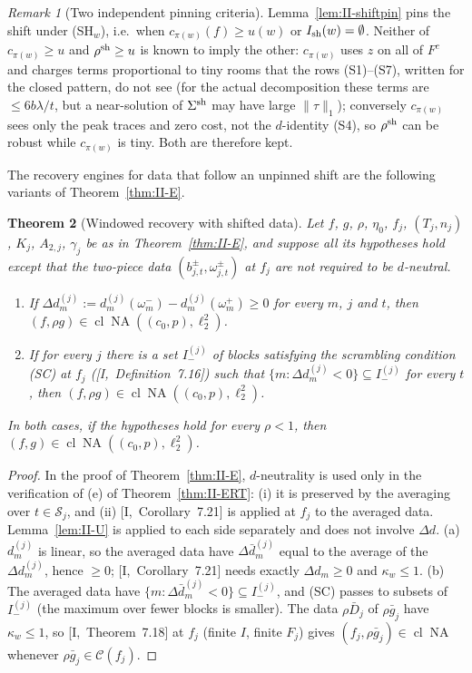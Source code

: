 \documentclass[10pt]{amsart}
\newtheorem{theorem}{Theorem}[section]
\theoremstyle{definition}
\theoremstyle{remark}
\newtheorem{remark}[theorem]{Remark}
\newcommand{\NA}{\operatorname{NA}}
\newcommand{\Cset}{\mathcal C}
\newcommand{\cl}{\operatorname{cl}}
\begin{document}
\begin{remark}[Two independent pinning criteria]\label{rem:II-twocrit}
Lemma~\ref{lem:II-shiftpin} pins the shift under (SH$_w$), i.e.\ when $c_{\pi(w)}(f)\ge
u(w)$ or $I_{\rm sh}(w)=\emptyset$.  Neither of $c_{\pi(w)}\ge u$ and
$\rho^{\rm sh}\ge u$ is known to imply the other: $c_{\pi(w)}$ uses $z$ on all
of $F^c$ and charges terms proportional to tiny rooms that the rows
(S1)--(S7), written for the closed pattern, do not see (for the actual
decomposition these terms are $\le6b\lambda/t$, but a near-solution of
$\Sigma^{\rm sh}$ may have large $\|\tau\|_1$); conversely $c_{\pi(w)}$ sees
only the peak traces and zero cost, not the $d$-identity (S4), so $\rho^{\rm
sh}$ can be robust while $c_{\pi(w)}$ is tiny.  Both are therefore kept.
\end{remark}

The recovery engines for data that follow an unpinned shift are the
following variants of Theorem~\ref{thm:II-E}.

\begin{theorem}[Windowed recovery with shifted data]\label{thm:II-Eshift}
Let $f$, $g$, $\rho$, $\eta_0$, $f_j$, $(T_j,n_j)$, $K_j$, $A_{2,j}$,
$\gamma_j$ be as in Theorem~\textup{\ref{thm:II-E}}, and suppose all its
hypotheses hold except that the two-piece data $(b^\pm_{j,t},\omega^\pm_{j,t})$
at $f_j$ are not required to be $d$-neutral.
\begin{enumerate}
\item[(a)] If $\Delta d^{(j)}_m:=d^{(j)}_m(\omega^-_m)-d^{(j)}_m(\omega^+_m)\ge0$
for every $m$, $j$ and $t$, then $(f,\rho g)\in\cl\NA((c_0,p),\ell_2^2)$.
\item[(b)] If for every $j$ there is a set $I_-^{(j)}$ of blocks satisfying
the scrambling condition \textup{(SC)} at $f_j$ \textup{(}[I,~Definition~7.16]\textup{)}
such that $\{m:\Delta d^{(j)}_m<0\}\subseteq I_-^{(j)}$ for every $t$, then
$(f,\rho g)\in\cl\NA((c_0,p),\ell_2^2)$.
\end{enumerate}
In both cases, if the hypotheses hold for every $\rho<1$, then $(f,g)\in
\cl\NA((c_0,p),\ell_2^2)$.
\end{theorem}

\begin{proof}
In the proof of Theorem~\ref{thm:II-E}, $d$-neutrality is used only in the
verification of (e) of Theorem~\ref{thm:II-ERT}: (i) it is preserved by the
averaging over $t\in\mathcal S_j$, and (ii) [I,~Corollary~7.21] is applied at
$f_j$ to the averaged data.  Lemma~\ref{lem:II-U} is applied to each side
separately and does not involve $\Delta d$.  (a) $d^{(j)}_m$ is linear, so
the averaged data have $\Delta\bar d^{(j)}_m$ equal to the average of the
$\Delta d^{(j)}_m$, hence $\ge0$; [I,~Corollary~7.21] needs exactly $\Delta
d_m\ge0$ and $\kappa_w\le1$.  (b) The averaged data have $\{m:\Delta\bar
d^{(j)}_m<0\}\subseteq I_-^{(j)}$, and (SC) passes to subsets of $I_-^{(j)}$
(the maximum over fewer blocks is smaller).  The data $\rho\bar D_j$ of
$\rho\bar g_j$ have $\kappa_w\le1$, so [I,~Theorem~7.18] at $f_j$ (finite
$I$, finite $F_j$) gives $(f_j,\rho\bar g_j)\in\cl\NA$ whenever $\rho\bar
g_j\in\Cset(f_j)$.
\end{proof}
\end{document}
